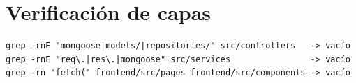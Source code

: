 \documentclass[11pt,letterpaper]{article}
\begin{document}
\section*{Verificación de capas}
\label{sec:verificacion}
{\small
\begin{verbatim}
grep -rnE "mongoose|models/|repositories/" src/controllers   -> vacío
grep -rnE "req\.|res\.|mongoose" src/services                -> vacío
grep -rn "fetch(" frontend/src/pages frontend/src/components -> vacío
\end{verbatim}
}
\end{document}
